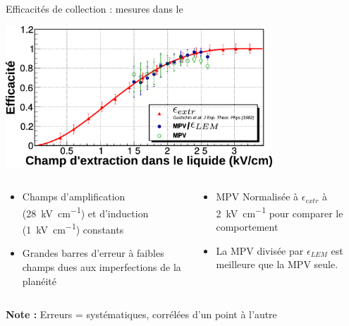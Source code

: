     \begin{frame}{Efficacités de collection : mesures dans le \TOO{}}
        \begin{scriptsize}
            \centering
            \includegraphics[width=0.75\textwidth]{./pictures/comp_311_eff.pdf}
            \vspace{0.2cm}
            \begin{columns}
                \begin{column}{0.5\textwidth}
                    \begin{itemize}
                        \item Champs d'amplification (\SI{28}{\kilo\volt\per\centi\meter}) et d'induction (\SI{1}{\kilo\volt\per\centi\meter}) constants
                        \item Grandes barres d'erreur à faibles champs dues aux imperfections de la planéité
                    \end{itemize}
                \end{column}
                \begin{column}{0.5\textwidth}
                    \begin{itemize}
                        \item MPV Normalisée à $\epsilon_{extr}$ à \SI{2}{\kilo\volt\per\centi\meter} pour comparer le comportement
                        \item La MPV divisée par  $\epsilon_{LEM}$ est meilleure que la MPV seule.
                    \end{itemize}
                \end{column}
            \end{columns}
            \vfill
            \textbf{Note :} Erreurs = systématiques, corrélées d'un point à l'autre
        \end{scriptsize}
    \end{frame}

